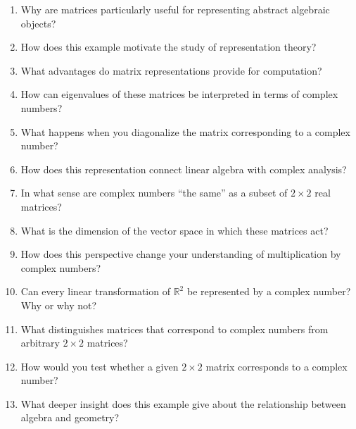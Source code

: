 \begin{enumerate}
\item Why are matrices particularly useful for representing abstract algebraic objects?

\item How does this example motivate the study of representation theory?

\item What advantages do matrix representations provide for computation?

\item How can eigenvalues of these matrices be interpreted in terms of complex numbers?

\item What happens when you diagonalize the matrix corresponding to a complex number?

\item How does this representation connect linear algebra with complex analysis?

\item In what sense are complex numbers ``the same'' as a subset of $2 \times 2$ real matrices?

\item What is the dimension of the vector space in which these matrices act?

\item How does this perspective change your understanding of multiplication by complex numbers?

\item Can every linear transformation of $\mathbb{R}^2$ be represented by a complex number? Why or why not?

\item What distinguishes matrices that correspond to complex numbers from arbitrary $2 \times 2$ matrices?

\item How would you test whether a given $2 \times 2$ matrix corresponds to a complex number?

\item What deeper insight does this example give about the relationship between algebra and geometry?

\end{enumerate}
